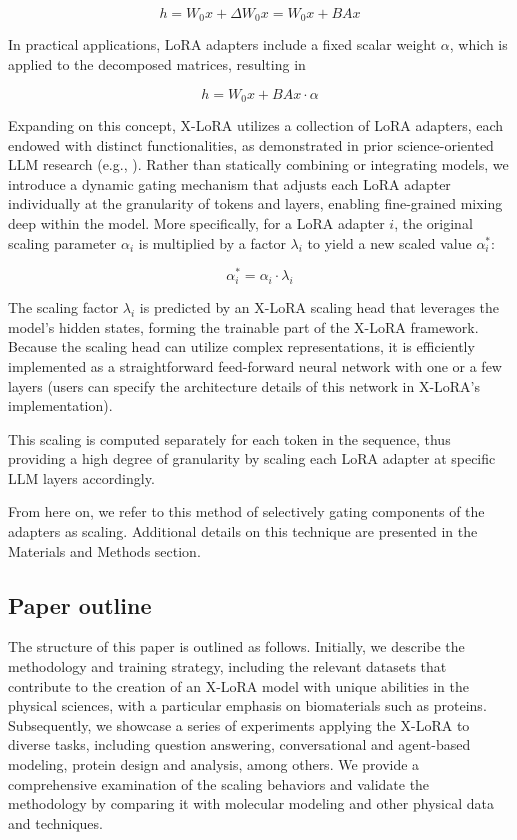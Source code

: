 \begin{equation}
    h = W_0x + \Delta W_0x = W_0x + BAx
\end{equation}

In practical applications, LoRA adapters include a fixed scalar weight $\alpha$, which is applied to the decomposed matrices, resulting in

\begin{equation}
    h = W_0x + BAx \cdot \alpha
\end{equation}

Expanding on this concept, X-LoRA utilizes a collection of LoRA adapters, each endowed with distinct functionalities, as demonstrated in prior science-oriented LLM research (e.g., \cite{Buehler2023GenerativeDesign}). Rather than statically combining or integrating models, we introduce a dynamic gating mechanism that adjusts each LoRA adapter individually at the granularity of tokens and layers, enabling fine-grained mixing deep within the model. More specifically, for a LoRA adapter $i$, the original scaling parameter $\alpha_i$ is multiplied by a factor $\lambda_i$ to yield a new scaled value $\alpha^*_i$:

\begin{equation}
    \alpha^*_i = \alpha_i \cdot \lambda_i
\end{equation}

The scaling factor $\lambda_i$ is predicted by an X-LoRA scaling head that leverages the model’s hidden states, forming the trainable part of the X-LoRA framework. Because the scaling head can utilize complex representations, it is efficiently implemented as a straightforward feed-forward neural network with one or a few layers (users can specify the architecture details of this network in X-LoRA’s implementation).

This scaling is computed separately for each token in the sequence, thus providing a high degree of granularity by scaling each LoRA adapter at specific LLM layers accordingly.

From here on, we refer to this method of selectively gating components of the adapters as scaling. Additional details on this technique are presented in the Materials and Methods section.

\subsection{Paper outline}

The structure of this paper is outlined as follows. Initially, we describe the methodology and training strategy, including the relevant datasets that contribute to the creation of an X-LoRA model with unique abilities in the physical sciences, with a particular emphasis on biomaterials such as proteins. Subsequently, we showcase a series of experiments applying the X-LoRA to diverse tasks, including question answering, conversational and agent-based modeling, protein design and analysis, among others. We provide a comprehensive examination of the scaling behaviors and validate the methodology by comparing it with molecular modeling and other physical data and techniques.

